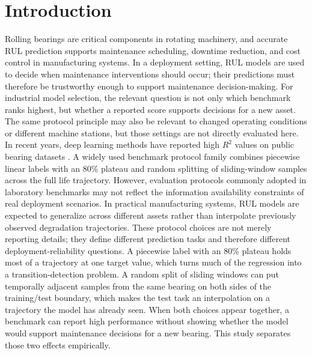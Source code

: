 \documentclass[pdflatex,sn-mathphys-num]{sn-jnl}
\begin{document}
\section{Introduction}
Rolling bearings are critical components in rotating machinery, and accurate RUL prediction supports maintenance scheduling, downtime reduction, and cost control in manufacturing systems. \cite{lei2018machinery,zhao2019deep} In a deployment setting, RUL models are used to decide when maintenance interventions should occur; their predictions must therefore be trustworthy enough to support maintenance decision-making. For industrial model selection, the relevant question is not only which benchmark ranks highest, but whether a reported score supports decisions for a new asset. The same protocol principle may also be relevant to changed operating conditions or different machine stations, but those settings are not directly evaluated here. In recent years, deep learning methods have reported high $R^2$ values on public bearing datasets \cite{rul_lstm_uq_2022,reg_lstm_2021,gru_tim_2021,transformer_tim_2023}. A widely used benchmark protocol family combines piecewise linear labels with an 80\% plateau and random splitting of sliding-window samples across the full life trajectory. However, evaluation protocols commonly adopted in laboratory benchmarks may not reflect the information availability constraints of real deployment scenarios.
In practical manufacturing systems, RUL models are expected to generalize across different assets rather than interpolate previously observed degradation trajectories. These protocol choices are not merely reporting details; they define different prediction tasks and therefore different deployment-reliability questions. A piecewise label with an 80\% plateau holds most of a trajectory at one target value, which turns much of the regression into a transition-detection problem. A random split of sliding windows can put temporally adjacent samples from the same bearing on both sides of the training/test boundary, which makes the test task an interpolation on a trajectory the model has already seen. When both choices appear together, a benchmark can report high performance without showing whether the model would support maintenance decisions for a new bearing. This study separates those two effects empirically.
\end{document}
